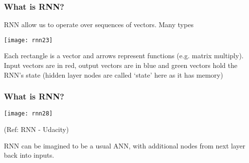 \begin{frame}[fragile] \frametitle{What is RNN?}

RNN allow us to operate over sequences of vectors. Many types
\begin{center}
\texttt{[image: rnn23]}
\end{center}
Each rectangle is a vector and arrows represent functions (e.g. matrix multiply). Input vectors are in red, output vectors are in blue and green vectors hold the RNN's state (hidden layer nodes are called `state' here as it has memory)

\end{frame}

\begin{frame}[fragile] \frametitle{What is RNN?}

\begin{center}
\texttt{[image: rnn28]}

\tiny{(Ref: RNN - Udacity)}

\end{center}

RNN can be imagined to be a usual ANN, with additional nodes from next layer back into inputs.
\end{frame}








